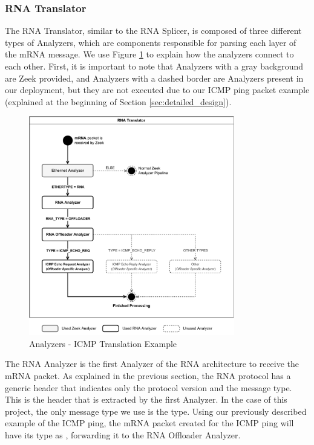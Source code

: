 \subsubsection*{RNA Translator}

The RNA Translator, similar to the RNA Splicer, is composed of three different types of Analyzers, which are components responsible for parsing each layer of the mRNA message. We use Figure \ref{fig:icmp_ex_translator} to explain how the analyzers connect to each other. First, it is important to note that Analyzers with a gray background are Zeek provided, and Analyzers with a dashed border are Analyzers present in our deployment, but they are not executed due to our ICMP ping packet example (explained at the beginning of Section \ref{sec:detailed_design}).

\begin{figure}[ht]
    \caption{Analyzers - ICMP Translation Example}
    \begin{center}
        \includegraphics[width=0.8\textwidth]{images/icmp_ex_translator.pdf}  
    \end{center}
    \label{fig:icmp_ex_translator}
\end{figure}

The RNA Analyzer is the first Analyzer of the RNA architecture to receive the mRNA packet. As explained in the previous section, the RNA protocol has a generic header that indicates only the protocol version and the message type. This is the header that is extracted by the first Analyzer. In the case of this project, the only message type we use is the \Offloader{} type\footnotemark. Using our previously described example of the ICMP ping, the mRNA packet created for the ICMP ping will have its type as \textsc{\Offloader{}}, forwarding it to the RNA Offloader Analyzer.

